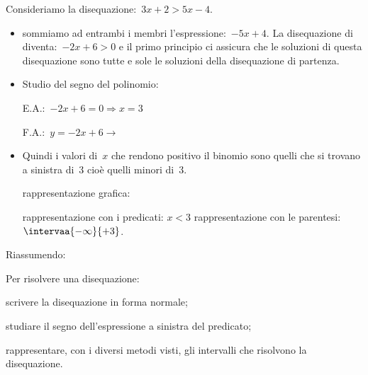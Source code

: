  \begin{esempio}
Consideriamo la disequazione:~\(3x + 2 > 5 x -4\).
\begin{itemize} [noitemsep]
 \item sommiamo ad entrambi i membri l'espressione:~\(-5 x +4\). 
La disequazione di diventa:~\(-2 x +6 > 0\) e il primo principio ci assicura 
che le soluzioni di questa disequazione sono tutte e sole le soluzioni della 
disequazione di partenza.

 \item Studio del segno del polinomio: \\
 \begin{minipage}{.45\textwidth}
  E.A.:~\(-2 x +6=0 \Rightarrow  x=3\)
 \end{minipage}
 \begin{minipage}{.25\textwidth}
  F.A.:~\(y=-2 x +6 \rightarrow \)
 \end{minipage}
 \begin{minipage}{.3\textwidth}
%   
 \end{minipage}
 \item Quindi i valori di~\(x\) che rendono positivo il binomio sono quelli 
 che si trovano a sinistra di~3 cioè quelli minori di~3. 
 \subitem 
  \begin{minipage}{.35\textwidth}
   rappresentazione grafica: 
  \end{minipage}
  \begin{minipage}{.30\textwidth}
%    
  \end{minipage}
 \subitem rappresentazione con i predicati: \quad \(x < 3\) 
 \subitem rappresentazione con le parentesi: 
\quad \(\intervaa{-\infty}{+3}\). 
\end{itemize}
 \end{esempio}

Riassumendo:

\begin{procedura}
 Per risolvere una disequazione:
\begin{enumeratea}
 \item scrivere la disequazione in forma normale;
 \item studiare il segno dell'espressione a sinistra del predicato;
 \item rappresentare, con i diversi metodi visti, 
  gli intervalli che risolvono la disequazione.
\end{enumeratea}
\end{procedura}

